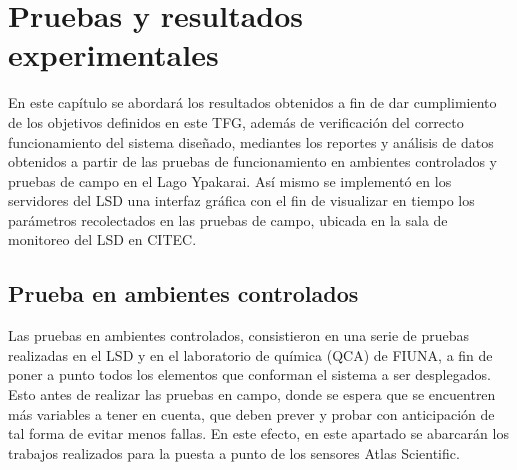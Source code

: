 \chapter[Pruebas y resultados experimentales]{ Pruebas y resultados experimentales}
\pagestyle{fancy}

En este cap\'itulo se abordar\'a los resultados obtenidos a fin de dar cumplimiento de los objetivos definidos en este TFG, adem\'as de verificación del correcto funcionamiento del sistema dise\~nado, mediantes los reportes y an\'alisis de datos obtenidos a partir de las  pruebas de funcionamiento en ambientes controlados y pruebas de campo en el Lago Ypakarai.  
 As\'i mismo se implement\'o en los servidores del LSD una interfaz gr\'afica con el fin de visualizar en tiempo los parámetros recolectados en las pruebas de campo, ubicada en la sala de monitoreo del LSD en CITEC.

\section{Prueba en ambientes controlados}
Las pruebas en ambientes controlados, consistieron en una serie de pruebas realizadas en el LSD y en el laboratorio de qu\'imica (QCA) de FIUNA, a fin de poner a punto todos los elementos que conforman el sistema a ser desplegados. 
Esto antes de realizar las pruebas en campo, donde se espera que se encuentren m\'as variables a tener en cuenta, que deben prever y probar con anticipaci\'on de tal forma de evitar menos fallas.
En este efecto, en este apartado se abarcar\'an los trabajos realizados para la puesta a punto de los sensores Atlas Scientific.


